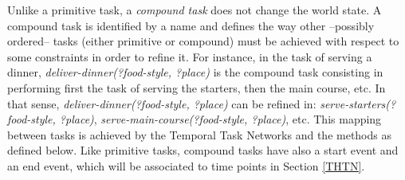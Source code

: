 \documentclass[letterpaper]{article} %
\begin{document}
Unlike a primitive task, %
a {\it compound task} does not change the world state.
A compound task is identified by a name and defines the way other --possibly ordered-- tasks (either primitive or compound) must be achieved with respect to some constraints in order to refine it.
For instance, in the task of serving a dinner, {\it deliver-dinner(?food-style, ?place)} is the compound task consisting in performing first the task of serving the starters, then the main course, etc. In that sense,  {\it deliver-dinner(?food-style, ?place)} can be refined in: {\it serve-starters(?food-style, ?place)},  {\it serve-main-course(?food-style, ?place)}, etc. This mapping between tasks is achieved by the Temporal Task Networks and the methods as defined below. Like primitive tasks, compound tasks have also a start event and an end event, which will be associated to time points in Section \ref{THTN}.
\end{document}
